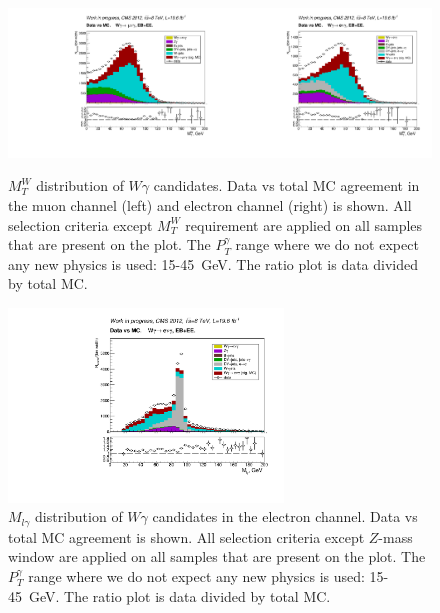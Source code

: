 \begin{figure}[htb]
  \begin{center}
   \includegraphics[width=0.5\textwidth]{../figs/figs_v11/MUON_WGamma/PrepareYields/c_TotalDATAvsMC_EtaCommon__WMtVERY_PRELIMINARY.pdf}\includegraphics[width=0.5\textwidth]{../figs/figs_v11/ELECTRON_WGamma/PrepareYields/c_TotalDATAvsMC_EtaCommon__WMtVERY_PRELIMINARY.pdf}
  \caption{$M_T^W$ distribution of $W\gamma$ candidates. Data vs total MC agreement in the muon channel (left) and electron channel (right) is shown. All selection criteria except $M_{T}^W$ requirement are applied on all samples that are present on the plot. The $P_T^{\gamma}$ range where we do not expect any new physics is used: 15-45~GeV. The ratio plot is data divided by total MC. }
  \label{fig:DATAvsMC_WMt}
  \end{center}
\end{figure}

\begin{figure}[htb]
  \begin{center}
   \includegraphics[width=0.65\textwidth]{../figs/figs_v11/ELECTRON_WGamma/PrepareYields/c_TotalDATAvsMC_EtaCommon__Mpholep1PRELIMINARY_FOR_E_TO_GAMMA_WITH_PSV_CUT.pdf}
  \caption{$M_{l\gamma}$ distribution of $W\gamma$ candidates in the electron channel. Data vs total MC agreement is shown. All selection criteria except $Z$-mass window are applied on all samples that are present on the plot. The $P_T^{\gamma}$ range where we do not expect any new physics is used: 15-45~GeV. The ratio plot is data divided by total MC.}
  \label{fig:DATAvsMC_Mpholep1}
  \end{center}
\end{figure}

